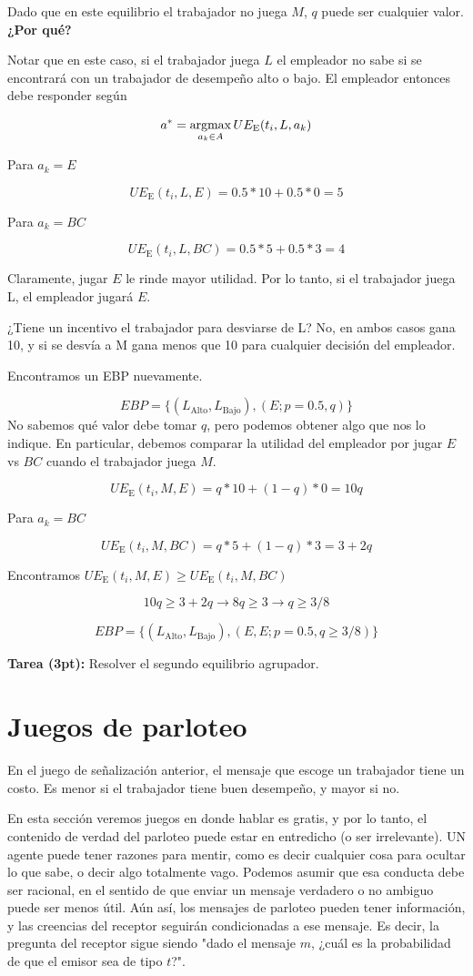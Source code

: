 \documentclass[12pt]{article}
\newcommand{\UE}[2]{UE_{\text{#1}}(#2)}
\begin{document}
Dado que en este equilibrio el trabajador no juega $ M $, $ q $ puede ser cualquier valor. \textbf{¿Por qué?}

Notar que en este caso, si el trabajador juega $ L $ el empleador no sabe si se encontrará con un trabajador de desempeño alto o bajo. El empleador entonces debe responder según

\[a^* = \argmax_{a_k \in A} \UE{E}{t_i, L, a_k}\]

Para $ a_k = E $

\[
\UE{E}{t_i, L, E}	= 0.5*10 + 0.5*0 = 5
\]

Para $ a_k = BC $

\[
\UE{E}{t_i, L, BC} =	0.5*5 + 0.5*3 = 4
\]

Claramente, jugar $ E $ le rinde mayor utilidad. Por lo tanto, si el trabajador juega L, el empleador jugará $ E $. 

¿Tiene un incentivo el trabajador para desviarse de L? No, en ambos casos gana 10, y si se desvía a M gana menos que 10 para cualquier decisión del empleador.

Encontramos un EBP nuevamente.

\[
	EBP = \{(L_{\text{Alto}}, L_{\text{Bajo}}), (E; p = 0.5, q)\}	
\]
No sabemos qué valor debe tomar $ q $, pero podemos obtener algo que nos lo indique. En particular, debemos comparar la utilidad del empleador por jugar $ E $ vs $ BC $ cuando el trabajador juega $ M $.


\[
\UE{E}{t_i, M, E}	= q*10 + (1-q)*0 = 10q
\]

Para $ a_k = BC $

\[
\UE{E}{t_i, M, BC} =	q*5 + (1-q)*3 = 3+2q
\]

Encontramos $ \UE{E}{t_i, M, E} \geq \UE{E}{t_i, M, BC} $

\[
10q 	 \geq 3+2q \longrightarrow 8q\geq 3 \longrightarrow q\geq 3/8
\]

\[
	EBP = \{(L_{\text{Alto}}, L_{\text{Bajo}}), (E, E; p = 0.5, q\geq 3/8)\}	
\]

\textbf{Tarea (3pt):} Resolver el segundo equilibrio agrupador. 

\section{Juegos de parloteo}

En el juego de señalización anterior, el mensaje que escoge un trabajador tiene un costo. Es menor si el trabajador tiene buen desempeño, y mayor si no. 

En esta sección veremos juegos en donde hablar es gratis, y por lo tanto, el contenido de verdad del parloteo puede estar en entredicho (o ser irrelevante). UN agente puede tener razones para mentir, como es decir cualquier cosa para ocultar lo que sabe, o decir algo totalmente vago. Podemos asumir que esa conducta debe ser racional, en el sentido de que enviar un mensaje verdadero o no ambiguo puede ser menos útil. Aún así, los mensajes de parloteo pueden tener información, y las creencias del receptor seguirán condicionadas a ese mensaje. Es decir, la pregunta del receptor sigue siendo "dado el mensaje $m$, ¿cuál es la probabilidad de que el emisor sea de tipo $t$?".
\end{document}
